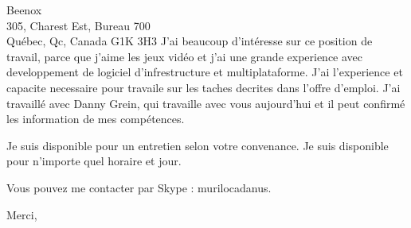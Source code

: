 \documentclass[11pt]{letter} %
\begin{document}
\begin{letter}{%
Beenox \\
305, Charest Est, Bureau 700 \\
Québec, Qc, Canada G1K 3H3}
J'ai beaucoup d'intéresse sur ce position de travail, parce que j'aime les jeux vidéo et j'ai une grande experience avec developpement de logiciel d'infrestructure et multiplataforme. J'ai l'experience et capacite necessaire pour travaile sur les taches decrites dans l'offre d'emploi. J'ai travaillé avec Danny Grein, qui travaille avec vous aujourd'hui et il peut confirmé les information de mes compétences.

Je suis disponible pour un entretien selon votre convenance. Je suis disponible pour n'importe quel horaire et jour.

Vous pouvez me contacter par Skype : murilocadanus.

\closing{Merci, }


\end{letter}
\end{document}
